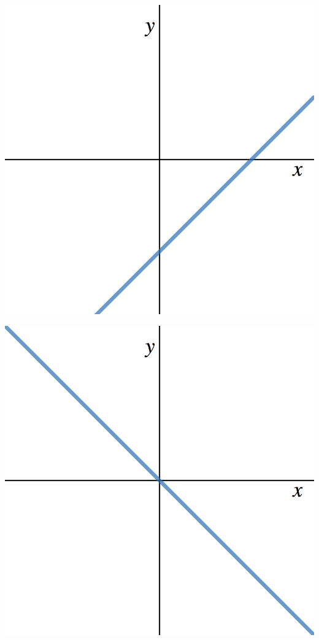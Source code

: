 \documentclass[11pt]{exam}
\theoremstyle{definition}
\begin{document}
\begin{questions}
\begin{enumerate}[(I)]
\begin{minipage}{.35\textwidth}
	\end{minipage}
\vskip 5mm
	\begin{minipage}{.35\textwidth}
	\item \includegraphics[scale=0.1]{linearIV.png}
	\end{minipage}
	\begin{minipage}{.35\textwidth}
	\item \includegraphics[scale=0.1]{linearV.png}

\end{minipage}
\end{enumerate}
\end{questions}
\end{document}
